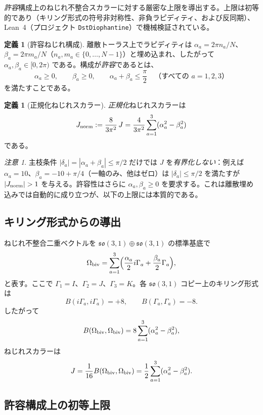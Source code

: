 \documentclass[dvipdfmx,a4paper]{article}
\theoremstyle{definition}
\newtheorem{definition}[theorem]{定義}
\theoremstyle{remark}
\newtheorem{remark}[theorem]{注意}
\newcommand{\Jnorm}{J_{\rm norm}}
\begin{document}
\emph{許容}構成上のねじれ不整合スカラーに対する厳密な上限を導出する。上限は初等的であり（キリング形式の符号非対称性、非負ラピディティ、および反同期）、Lean~4（プロジェクト \texttt{DstDiophantine}）で機械検証されている。

\begin{definition}[許容ねじれ構成]
\label{def:admissible-ja}
離散トーラス上でラピディティは $\alpha_a = 2\pi n_a/N$、$\beta_a = 2\pi m_a/N$（$n_a,m_a \in \{0,\dots,N-1\}$）と埋め込まれ、したがって $\alpha_a,\beta_a \in [0,2\pi)$ である。構成が\emph{許容}であるとは、
\[
\alpha_a \geq 0, \qquad \beta_a \geq 0, \qquad \alpha_a + \beta_a \leq \frac{\pi}{2}
\quad \text{（すべての } a = 1,2,3\text{）}
\]
を満たすことである。
\end{definition}

\begin{definition}[正規化ねじれスカラー]
\label{def:Jnorm-ja}
\emph{正規化}ねじれスカラーは
\[
\Jnorm := \frac{8}{3\pi^2}\,J
= \frac{4}{3\pi^2}\sum_{a=1}^3 (\alpha_a^2 - \beta_a^2)
\]
である。
\end{definition}

\begin{remark}
主枝条件 $|\delta_a| = |\alpha_a + \beta_a| \leq \pi/2$ だけでは $J$ を\emph{有界化しない}：例えば $\alpha_a = 10$、$\beta_a = -10 + \pi/4$（一軸のみ、他はゼロ）は $|\delta_a| \leq \pi/2$ を満たすが $|\Jnorm| > 1$ を与える。許容性はさらに $\alpha_a,\beta_a \geq 0$ を要求する。これは離散埋め込みでは自動的に成り立つが、以下の上限には本質的である。
\end{remark}

\subsection{キリング形式からの導出}

ねじれ不整合二重ベクトルを $\mathfrak{so}(3,1) \oplus \mathfrak{so}(3,1)$ の標準基底で
\[
\Omega_{\rm biv} = \sum_{a=1}^3 \Bigl( \frac{\alpha_a}{2} i\Gamma_a + \frac{\beta_a}{2} \Gamma_a \Bigr),
\]
と表す。ここで $\Gamma_1 = I$、$\Gamma_2 = J$、$\Gamma_3 = K$。各 $\mathfrak{so}(3,1)$ コピー上のキリング形式は
\[
B(i\Gamma_a, i\Gamma_a) = +8, \qquad B(\Gamma_a, \Gamma_a) = -8.
\]
したがって
\[
B(\Omega_{\rm biv}, \Omega_{\rm biv}) = 8 \sum_{a=1}^3 (\alpha_a^2 - \beta_a^2),
\]
ねじれスカラーは
\[
J = \frac{1}{16} B(\Omega_{\rm biv}, \Omega_{\rm biv}) = \frac12 \sum_{a=1}^3 (\alpha_a^2 - \beta_a^2).
\]

\subsection{許容構成上の初等上限}
\end{document}
